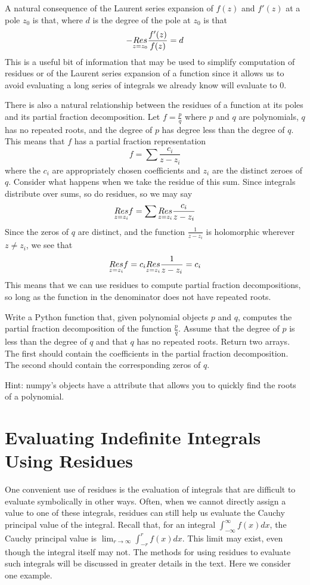 A natural consequence of the Laurent series expansion of $f(z)$ and $f'(z)$ at a pole $z_0$ is that, where $d$ is the degree of the pole at $z_0$ is that
\[- \underset{z=z_0}{Res} \frac{f'(z)}{f(z)} = d\]
This is a useful bit of information that may be used to simplify computation of residues or of the Laurent series expansion of a function since it allows us to avoid evaluating a long series of integrals we already know will evaluate to $0$.

There is also a natural relationship between the residues of a function at its poles and its partial fraction decomposition.
Let $f = \frac{p}{q}$ where $p$ and $q$ are polynomials, $q$ has no repeated roots, and the degree of $p$ has degree less than the degree of $q$.
This means that $f$ has a partial fraction representation
\[f = \sum \frac{c_i}{z - z_i}\]
where the $c_i$ are appropriately chosen coefficients and $z_i$ are the distinct zeroes of $q$.
Consider what happens when we take the residue of this sum.
Since integrals distribute over sums, so do residues, so we may say
\[\underset{z=z_i}{Res} f = \sum \underset{z=z_i}{Res} \frac{c_i}{z - z_i}\]
Since the zeros of $q$ are distinct, and the function $\frac{1}{z - z_i}$ is holomorphic wherever $z \neq z_i$, we see that
\[\underset{z=z_i}{Res} f = c_i \underset{z=z_i}{Res} \frac{1}{z-z_i} = c_i\]
This means that we can use residues to compute partial fraction decompositions, so long as the function in the denominator does not have repeated roots.

\begin{problem}
Write a Python function that, given polynomial objects $p$ and $q$, computes the partial fraction decomposition of the function $\frac{p}{q}$.
Assume that the degree of $p$ is less than the degree of $q$ and that $q$ has no repeated roots.
Return two arrays.
The first should contain the coefficients in the partial fraction decomposition.
The second should contain the corresponding zeros of $q$.

Hint: numpy's  objects have a  attribute that allows you to quickly find the roots of a polynomial.
\end{problem}

\section*{Evaluating Indefinite Integrals Using Residues}

One convenient use of residues is the evaluation of integrals that are difficult to evaluate symbolically in other ways.
Often, when we cannot directly assign a value to one of these integrals, residues can still help us evaluate the Cauchy principal value of the integral.
Recall that, for an integral $\int_{-\infty}^{\infty} f(x)dx$, the Cauchy principal value is $\lim_{r\to \infty} \int_{-r}^{r} f(x) dx$.
This limit may exist, even though the integral itself may not.
The methods for using residues to evaluate such integrals will be discussed in greater details in the text.
Here we consider one example.

